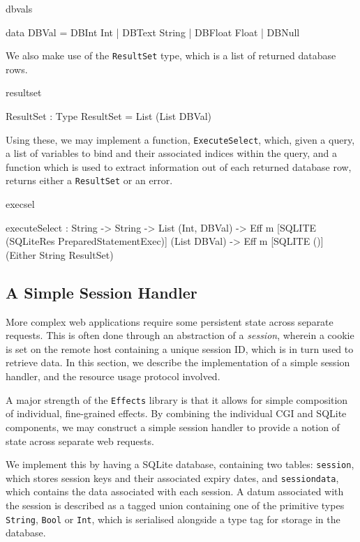\begin{SaveVerbatim}{dbvals}

data DBVal = DBInt Int     | DBText String
           | DBFloat Float | DBNull

\end{SaveVerbatim}

\noindent
We also make use of the \texttt{ResultSet} type, which is a list of returned
database rows.

\begin{SaveVerbatim}{resultset}

ResultSet : Type
ResultSet = List (List DBVal)

\end{SaveVerbatim}

\noindent
Using these, we may implement a function, \texttt{ExecuteSelect}, which, given
a query, a list of variables to bind and their associated indices within the
query, and a function which is used to extract information out of each returned
database row, returns either a \texttt{ResultSet} or an error.

\begin{SaveVerbatim}{execsel}

executeSelect : 
  String -> String -> List (Int, DBVal) -> 
  Eff m [SQLITE (SQLiteRes PreparedStatementExec)] 
                 (List DBVal) -> 
  Eff m [SQLITE ()] (Either String ResultSet)
\end{SaveVerbatim}

\subsection{A Simple Session Handler}
More complex web applications require some persistent state across separate
requests. This is often done through an abstraction of a \textit{session},
wherein a cookie is set on the remote host containing a unique session ID,
which is in turn used to retrieve data. In this section, we describe the
implementation of a simple session handler, and the resource usage protocol
involved. 

A major strength of the \texttt{Effects} library is that it allows for simple
composition of individual, fine-grained effects. By combining the individual
CGI and SQLite components, we may construct a simple session handler to provide
a notion of state across separate web requests. 

We implement this by having a SQLite database, containing two tables:
\texttt{session}, which stores session keys and their associated expiry dates,
and \texttt{sessiondata}, which contains the data associated with each session.
A datum associated with the session is described as a tagged union containing
one of the primitive types \texttt{String}, \texttt{Bool} or \texttt{Int},
which is serialised alongside a type tag for storage in the database.

